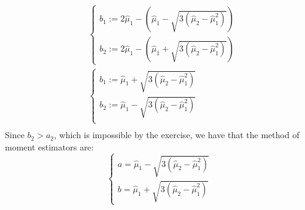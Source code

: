 \documentclass{article}
\begin{document}
\begin{align*}
     & \begin{cases}
        b_1 := 2\hat\mu_1 - \left(\hat\mu_1 - \sqrt{3\left(\hat\mu_2 - \hat\mu_1^2\right)}\right) \\
        b_2 := 2\hat\mu_1 - \left(\hat\mu_1 + \sqrt{3\left(\hat\mu_2 - \hat\mu_1^2\right)}\right)
    \end{cases} \\
     & \begin{cases}
        b_1 := \hat\mu_1 + \sqrt{3\left(\hat\mu_2 - \hat\mu_1^2\right)} \\
        b_2 := \hat\mu_1 - \sqrt{3\left(\hat\mu_2 - \hat\mu_1^2\right)} \\
    \end{cases} \\
\end{align*}
Since \(b_2 > a_2\), which is impossible by the exercise, we have that the method of moment estimators are:
\[
    \begin{cases}
        a = \hat\mu_1 - \sqrt{3\left(\hat\mu_2 - \hat\mu_1^2\right)} \\
        b = \hat\mu_1 + \sqrt{3\left(\hat\mu_2 - \hat\mu_1^2\right)}
    \end{cases}
\]
\end{document}
